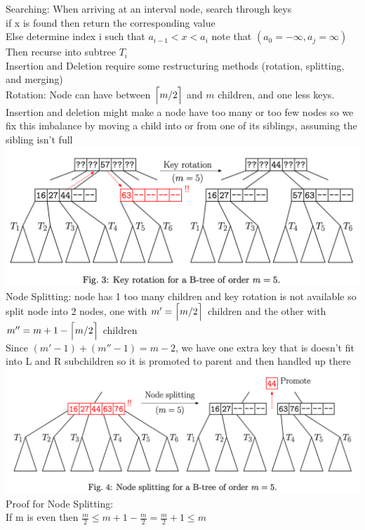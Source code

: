 \documentclass{article}
\DeclarePairedDelimiter{\ceil}{\lceil}{\rceil}
\begin{document}
  Searching: When arriving at an interval node, search through keys\\
  \indent if x is found then return the corresponding value\\
  \indent Else determine index i such that $a_{i-1} < x < a_{i}$ note that $(a_{0} = -\infty, a_{j} = \infty)$\\
  \indent Then recurse into subtree $T_{i}$\\
  Insertion and Deletion require some restructuring methods (rotation, splitting, and merging)\\
  Rotation: Node can have between $\ceil[\Big]{m/2}$ and $m$ children, and one less keys. Insertion and deletion might make a node have too many or too few nodes so we fix this imbalance by moving a child into or from one of its siblings, assuming the sibling isn't full\\
  \includegraphics[width=\textwidth]{BTreeRotations}
  Node Splitting: node has 1 too many children and key rotation is not available so split node into 2 nodes, one with $m' = \ceil[\Big]{m/2}$ children and the other with $m''= m + 1 - \ceil[\Big]{m/2}$ children\\
  Since $(m' - 1) + (m'' - 1) = m - 2$, we have one extra key that is doesn't fit into L and R subchildren so it is promoted to parent and then handled up there\\
  \includegraphics[width=\textwidth]{BTreeNodeSplitting}
  Proof for Node Splitting:\\
  If m is even then $\frac{m}{2} \leq m + 1 - \frac{m}{2} = \frac{m}{2} + 1 \leq m$\\
\end{document}
